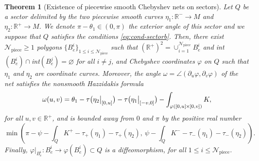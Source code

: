 \documentclass{article}
\newcommand{\PLH}{{\mkern-1mu\times\mkern-1mu}}
\newcommand{\Times}{\PLH}
\newcommand{\R}{\mathbb{R}}
\newcommand{\surf}{M}
\newcommand{\DU}{\partial_{u}}
\newcommand{\DV}{\partial_{v}}
\newcommand{\sect}{Q}
\newcommand{\halfP}{B}
\newcommand{\Npiece}{\mathcal{N}_{\mathrm{piece}}}
\newtheorem{theorem}{Theorem}
\theoremstyle{remark}
\theoremstyle{prpart}
\begin{document}
\begin{theorem}[Existence of piecewise smooth Chebyshev nets on sectors] \label{thm:piecewise-smooth-sector}
  Let $\sect$ be a sector delimited by the two piecewise smooth curves $\eta_1:\R^-\to\surf$ and $\eta_2:\R^+\to\surf$. We denote $\pi-\theta_1\in(0,\pi)$ the exterior angle of this sector and we suppose that $\sect$ satisfies the conditions \eqref{eq:cond-sectorb}. Then, there exist $\Npiece\geq 1$ polygons $\{\halfP^i_e\}_{1\leq i\leq \Npiece}$ such that $(\R^+)^2 = \cup_{i=1}^{\Npiece}\halfP^i_e$ and int$(\halfP^i_e)\cap$int$(\halfP_e^j)=\varnothing$ for all $i\neq j$, and Chebyshev coordinates $\varphi$ on $\sect$ such that $\eta_1$ and $\eta_2$ are coordinate curves. Moreover, the angle $\omega = \angle(\DU \varphi,\DV \varphi)$ of the net satisfies the nonsmooth Hazzidakis formula
\begin{equation}\label{eq:hazz-non-lisse}
  \omega(u,v) = \theta_1 - \tau\big(\eta_2\big|_{[0,u]}\big)
  - \tau \big(\eta_1\big|_{[-v,0]}\big) - \int_{\varphi([0,u]\Times[0,v])}K,
\end{equation}
for all $u,v\in\R^+$, and is bounded away from $0$ and $\pi$ by the positive real number
\begin{equation}\label{eq:bound-max-angles3}
\min\left(\pi-\psi-\int_\sect K^+-\tau_+(\eta_1)-\tau_+(\eta_2),~ 
\psi-\int_\sect K^- - \tau_-(\eta_1)-\tau_-(\eta_2)\right).
\end{equation}
Finally, $\varphi\big|_{\halfP^i_e}:\halfP^i_e\to\varphi(\halfP^i_e)\subset\sect$ is a diffeomorphism, for all $1\leq i\leq \Npiece$.
\end{theorem}
\end{document}
